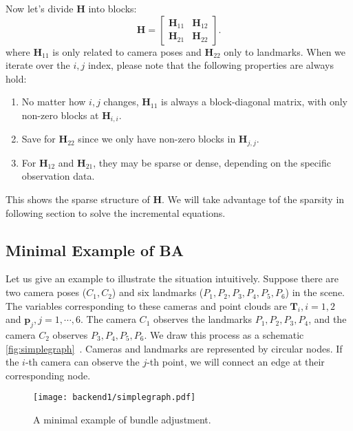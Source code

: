 Now let's divide $\mathbf{H}$ into blocks: 
\begin{equation}
	\label{eq:H-blocks}
	\mathbf{H} = \left[ {\begin{array}{*{20}{c}}
			{{\mathbf{H}_{11}}}&{{\mathbf{H}_{12}}}\\
			{{\mathbf{H}_{21}}}&{{\mathbf{H}_{22}}}
	\end{array}} \right] .
\end{equation}
where $\mathbf{H}_{11}$ is only related to camera poses and $\mathbf{H}_{22}$ only to landmarks. When we iterate over the $i,j$ index, please note that the following properties are always hold:
\begin{enumerate}
	\item No matter how $i,j$ changes, $\mathbf{H}_{11}$ is always a block-diagonal matrix, with only non-zero blocks at $\mathbf{H}_{i,i}$.
	\item Save for $\mathbf{H}_{22}$ since we only have non-zero blocks in $\mathbf{H}_{j,j}$. 
	\item  For $\mathbf{H}_{12}$ and $\mathbf{H}_{21}$, they may be sparse or dense, depending on the specific observation data.
\end{enumerate}
This shows the sparse structure of $\mathbf{H}$. We will take advantage tof the sparsity in following section to solve the incremental equations. 

\subsection{Minimal Example of BA}
Let us give an example to illustrate the situation intuitively. Suppose there are two camera poses ($C_1, C_2$) and six landmarks ($P_1, P_2, P_3, P_4, P_5, P_6$) in the scene. The variables corresponding to these cameras and point clouds are $\mathbf{T}_i, i = 1,2$ and $\mathbf{p}_j, j = 1,\cdots, 6$. The camera $C_1$ observes the landmarks $P_1, P_2, P_3, P_4$, and the camera $C_2$ observes $P_3, P_4, P_5, P_6$. We draw this process as a schematic \autoref{fig:simplegraph}~. Cameras and landmarks are represented by circular nodes. If the $i$-th camera can observe the $j$-th point, we will connect an edge at their corresponding node.

\begin{figure}[!htp]
	\centering
	\texttt{[image: backend1/simplegraph.pdf]}
	\caption{A minimal example of bundle adjustment. }
	\label{fig:simplegraph}
\end{figure}

